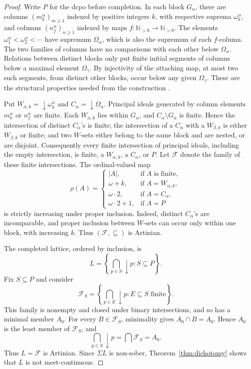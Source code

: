 \documentclass[11pt,reqno]{amsart}
\theoremstyle{definition}
\numberwithin{equation}{section}
\newcommand{\N}{\mathbb N}
\begin{document}
\begin{proof}
Write $P$ for the dcpo before completion. In each block $G_\alpha$,
there are columns $(m_k^\alpha)_{m\geq1}$ indexed by positive integers
$k$, with respective suprema $\omega_k^\alpha$, and columns
$(n_f^\alpha)_{n\geq1}$ indexed by maps $f:\N_{>0}\to\N_{>0}$.
The elements $\omega_1^\alpha<\omega_2^\alpha<\cdots$ have supremum
$\Omega_\alpha$, which is also the supremum of each $f$-column.
The two families of columns have no comparisons with each other below
$\Omega_\alpha$. Relations between distinct blocks only put finite
initial segments of columns below a maximal element $\Omega_\gamma$.
By injectivity of the attaching map, at most two such segments, from
distinct other blocks, occur below any given $\Omega_\gamma$.
These are the structural properties needed from the construction
\citep{Isbell1982,GoubaultLarrecqIsbell}.

Put $W_{\alpha,k}={\downarrow}\omega_k^\alpha$ and
$C_\alpha={\downarrow}\Omega_\alpha$. Principal ideals generated by
column elements $m_k^\alpha$ or $n_f^\alpha$ are finite.
Each $W_{\alpha,k}$ lies within $G_\alpha$, and
$C_\alpha\setminus G_\alpha$ is finite. Hence the intersection of
distinct $C_\alpha$'s is finite; the intersection of a $C_\alpha$
with a $W_{\beta,k}$ is either $W_{\beta,k}$ or finite; and two
$W$-sets either belong to the same block and are nested, or are disjoint.
Consequently every finite intersection of principal ideals, including
the empty intersection, is finite, a $W_{\alpha,k}$, a $C_\alpha$, or $P$.
Let $\mathcal F$ denote the family of these finite intersections.
The ordinal-valued map
\begin{equation}\label{eq:isbell-rank}
  \rho(A)=
  \begin{cases}
    |A|,&\text{if }A\text{ is finite},\\
    \omega+k,&\text{if }A=W_{\alpha,k},\\
    \omega\cdot2,&\text{if }A=C_\alpha,\\
    \omega\cdot2+1,&\text{if }A=P
  \end{cases}
\end{equation}
is strictly increasing under proper inclusion. Indeed, distinct
$C_\alpha$'s are incomparable, and proper inclusion between $W$-sets
can occur only within one block, with increasing $k$. Thus
$(\mathcal F,\subseteq)$ is Artinian.

The completed lattice, ordered by inclusion, is
\[
  L=\left\{\bigcap_{p\in S}{\downarrow}p:S\subseteq P\right\}.
\]
Fix $S\subseteq P$ and consider
\[
  \mathcal F_S=\left\{\bigcap_{p\in E}{\downarrow}p:
               E\subseteq S\text{ finite}\right\}.
\]
This family is nonempty and closed under binary intersections, and so
has a minimal member $A_0$. For every $B\in\mathcal F_S$,
minimality gives $A_0\cap B=A_0$. Hence $A_0$ is the least member of
$\mathcal F_S$, and
\[
  \bigcap_{p\in S}{\downarrow}p=\bigcap\mathcal F_S=A_0.
\]
Thus $L=\mathcal F$ is Artinian. Since $\Sigma L$ is non-sober,
Theorem~\ref{thm:dichotomy} shows that $L$ is not meet-continuous.


\end{proof}
\end{document}
